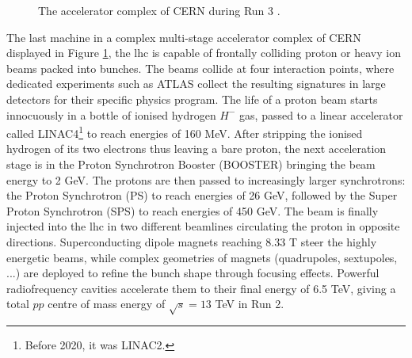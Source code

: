 \begin{figure}[!h]
  \centering
  \caption{The accelerator complex of CERN during Run 3 \cite{CERNAcc}.}
  \label{fig-CernAccSys}
\end{figure}

The last machine in a complex multi-stage accelerator complex of CERN displayed in Figure \ref{fig-CernAccSys}, the \gls{lhc} is capable of frontally colliding proton or heavy ion beams packed into bunches. The beams collide at four interaction points, where dedicated experiments such as ATLAS collect the resulting signatures in large detectors for their specific physics program. The life of a proton beam starts innocuously in a bottle of ionised hydrogen $H^-$ gas, passed to a linear accelerator called LINAC4\footnote{Before 2020, it was LINAC2.} to reach energies of 160 MeV. After stripping the ionised hydrogen of its two electrons thus leaving a bare proton, the next acceleration stage is in the Proton Synchrotron Booster (BOOSTER) bringing the beam energy to 2 GeV. The protons are then passed to increasingly larger synchrotrons: the Proton Synchrotron (PS) to reach energies of 26 GeV, followed by the Super Proton Synchrotron (SPS) to reach energies of 450 GeV. The beam is finally injected into the \gls{lhc} in two different beamlines circulating the proton in opposite directions. Superconducting dipole magnets reaching 8.33 T steer the highly energetic beams, while complex geometries of magnets (quadrupoles, sextupoles, ...) are deployed to refine the bunch shape through focusing effects. Powerful radiofrequency cavities accelerate them to their final energy of 6.5 TeV, giving a total $pp$ centre of mass energy of $\sqrt{s} = 13$ TeV in Run 2.  \\

